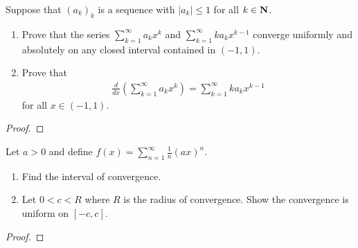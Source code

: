 \documentclass[11pt,twoside,openany]{memoir}
\begin{document}
\newpage
\fancyhead[L]{\scalebox{0.9}{Series of Functions}}
\fancyhead[R]{\scalebox{0.9}{Appeared on: W25}}
\begin{problem}
    Suppose that $(a_k)_k$ is a sequence with $|a_k| \leq 1$ for all $k \in \mathbf{N}$.
    \begin{enumerate}[label = (\arabic*)]
        \item Prove that the series $\sum_{k = 1}^\infty a_k x^k$ and $\sum_{k = 1}^\infty k a_k x^{k-1}$ converge uniformly and absolutely on any closed interval contained in $(-1,1)$.
        \item Prove that
            \begin{equation*}
            \begin{split}
                \frac{d}{dx}\left( \sum_{k = 1}^\infty a_k x^k \right) = \sum_{k = 1}^\infty k a_k x^{k-1}
            \end{split}
            \end{equation*}
        for all $x \in (-1,1)$.
    \end{enumerate}
\end{problem}
\begin{proof}
\end{proof}

\newpage
\fancyhead[L]{\scalebox{0.9}{Series of Functions}}
\fancyhead[R]{\scalebox{0.9}{Appeared on: F24}}
\begin{problem}
    Let $a > 0$ and define $f(x) = \sum_{n = 1}^\infty \frac{1}{n}(ax)^n$.
    \begin{enumerate}[label = (\arabic*)]
        \item Find the interval of convergence.
        \item Let $0 < c < R$ where $R$ is the radius of convergence. Show the convergence is uniform on $[-c,c]$.
    \end{enumerate}
\end{problem}
\begin{proof}
\end{proof}
\end{document}
